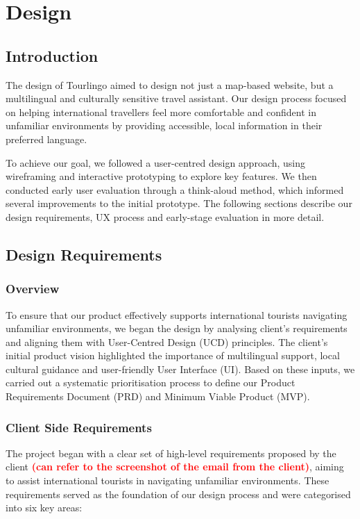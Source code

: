 \chapter{Design}

\section{Introduction}

The design of Tourlingo aimed to design not just a map-based website, but a multilingual and culturally sensitive travel assistant. Our design process focused on helping international travellers feel more comfortable and confident in unfamiliar environments by providing accessible, local information in their preferred language.

To achieve our goal, we followed a user-centred design approach, using wireframing and interactive prototyping to explore key features. We then conducted early user evaluation through a think-aloud method, which informed several improvements to the initial prototype. The following sections describe our design requirements, UX process and early-stage evaluation in more detail.

\section{Design Requirements}

\subsection{Overview}
To ensure that our product effectively supports international tourists navigating unfamiliar environments, we began the design by analysing client's requirements and aligning them with User-Centred Design (UCD) principles. The client's initial product vision highlighted the importance of multilingual support, local cultural guidance and user-friendly User Interface (UI). Based on these inputs, we carried out a systematic prioritisation process to define our Product Requirements Document (PRD) and Minimum Viable Product (MVP).

\subsection{Client Side Requirements}
The project began with a clear set of high-level requirements proposed by the client \textbf{\textcolor{red}{(can refer to the screenshot of the email from the client)}}, aiming to assist international tourists in navigating unfamiliar environments. These requirements served as the foundation of our design process and were categorised into six key areas:

